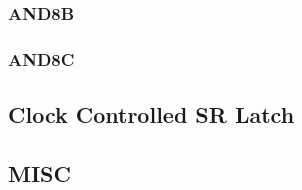 \documentclass{scrartcl}
\begin{document}
      \subsubsection{AND8B}
        
        
      \subsubsection{AND8C}
        
        

    \subsection{Clock Controlled SR Latch}
      
      

    \subsection{MISC}
      
\end{document}
